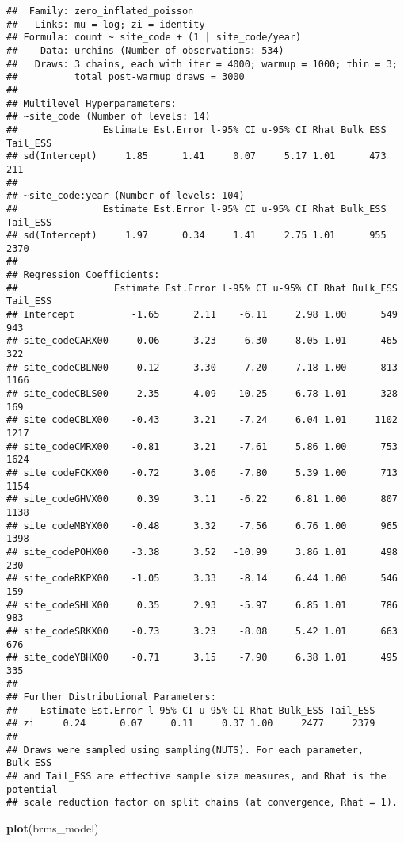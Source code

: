 \documentclass[
]{article}
\newenvironment{Shaded}{\begin{snugshade}}{\end{snugshade}}
\newcommand{\FunctionTok}[1]{\textcolor[rgb]{0.13,0.29,0.53}{\textbf{#1}}}
\newcommand{\NormalTok}[1]{#1}
\begin{document}
\begin{verbatim}
##  Family: zero_inflated_poisson 
##   Links: mu = log; zi = identity 
## Formula: count ~ site_code + (1 | site_code/year) 
##    Data: urchins (Number of observations: 534) 
##   Draws: 3 chains, each with iter = 4000; warmup = 1000; thin = 3;
##          total post-warmup draws = 3000
## 
## Multilevel Hyperparameters:
## ~site_code (Number of levels: 14) 
##               Estimate Est.Error l-95% CI u-95% CI Rhat Bulk_ESS Tail_ESS
## sd(Intercept)     1.85      1.41     0.07     5.17 1.01      473      211
## 
## ~site_code:year (Number of levels: 104) 
##               Estimate Est.Error l-95% CI u-95% CI Rhat Bulk_ESS Tail_ESS
## sd(Intercept)     1.97      0.34     1.41     2.75 1.01      955     2370
## 
## Regression Coefficients:
##                 Estimate Est.Error l-95% CI u-95% CI Rhat Bulk_ESS Tail_ESS
## Intercept          -1.65      2.11    -6.11     2.98 1.00      549      943
## site_codeCARX00     0.06      3.23    -6.30     8.05 1.01      465      322
## site_codeCBLN00     0.12      3.30    -7.20     7.18 1.00      813     1166
## site_codeCBLS00    -2.35      4.09   -10.25     6.78 1.01      328      169
## site_codeCBLX00    -0.43      3.21    -7.24     6.04 1.01     1102     1217
## site_codeCMRX00    -0.81      3.21    -7.61     5.86 1.00      753     1624
## site_codeFCKX00    -0.72      3.06    -7.80     5.39 1.00      713     1154
## site_codeGHVX00     0.39      3.11    -6.22     6.81 1.00      807     1138
## site_codeMBYX00    -0.48      3.32    -7.56     6.76 1.00      965     1398
## site_codePOHX00    -3.38      3.52   -10.99     3.86 1.01      498      230
## site_codeRKPX00    -1.05      3.33    -8.14     6.44 1.00      546      159
## site_codeSHLX00     0.35      2.93    -5.97     6.85 1.01      786      983
## site_codeSRKX00    -0.73      3.23    -8.08     5.42 1.01      663      676
## site_codeYBHX00    -0.71      3.15    -7.90     6.38 1.01      495      335
## 
## Further Distributional Parameters:
##    Estimate Est.Error l-95% CI u-95% CI Rhat Bulk_ESS Tail_ESS
## zi     0.24      0.07     0.11     0.37 1.00     2477     2379
## 
## Draws were sampled using sampling(NUTS). For each parameter, Bulk_ESS
## and Tail_ESS are effective sample size measures, and Rhat is the potential
## scale reduction factor on split chains (at convergence, Rhat = 1).
\end{verbatim}

\begin{Shaded}
\begin{Highlighting}[]
\FunctionTok{plot}\NormalTok{(brms\_model)}
\end{Highlighting}
\end{Shaded}
\end{document}
